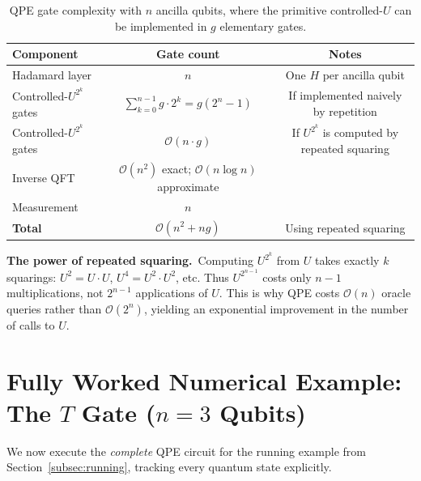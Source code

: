 \documentclass[12pt,a4paper]{article}
\newcommand{\QPE}{\textsc{QPE}}
\newcommand{\bigO}{\mathcal{O}}
\begin{document}
\begin{table}[ht]
\centering
\caption{QPE gate complexity with $n$ ancilla qubits, where the primitive
  controlled-$U$ can be implemented in $g$ elementary gates.}
\begin{tabular}{@{}lcc@{}}
\toprule
\textbf{Component} & \textbf{Gate count} & \textbf{Notes} \\
\midrule
Hadamard layer     & $n$ & One $H$ per ancilla qubit \\
Controlled-$U^{2^k}$ gates & $\sum_{k=0}^{n-1} g\cdot 2^k = g(2^n-1)$ & If implemented naively by repetition \\
Controlled-$U^{2^k}$ gates & $\bigO(n\cdot g)$ & If $U^{2^k}$ is computed by repeated squaring \\
Inverse QFT        & $\bigO(n^2)$ exact; $\bigO(n\log n)$ approximate & \\
Measurement        & $n$ & \\
\midrule
\textbf{Total}     & $\bigO(n^2 + ng)$ & Using repeated squaring \\
\bottomrule
\end{tabular}
\label{tab:complexity}
\end{table}

\begin{tcolorbox}[insight]
  \textbf{The power of repeated squaring.}\ Computing $U^{2^k}$ from $U$
  takes exactly $k$ squarings: $U^2 = U\cdot U$, $U^4 = U^2\cdot U^2$, etc.
  Thus $U^{2^{n-1}}$ costs only $n-1$ multiplications, not $2^{n-1}$
  applications of $U$.  This is why \QPE{} costs $\bigO(n)$ oracle queries
  rather than $\bigO(2^n)$, yielding an exponential improvement in the
  number of calls to $U$.
\end{tcolorbox}

\newpage

\section{Fully Worked Numerical Example: The \texorpdfstring{$T$}{T} Gate (\texorpdfstring{$n=3$}{n=3} Qubits)}
\label{sec:example}

We now execute the \emph{complete} \QPE{} circuit for the running example
from Section~\ref{subsec:running}, tracking every quantum state explicitly.
\end{document}
